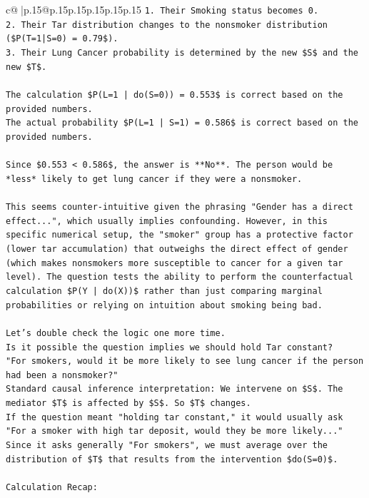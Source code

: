 \documentclass{article}
\begin{document}
{\begin{supertabular}{c@{$\;$}|p{.15\linewidth}@{}p{.15\linewidth}p{.15\linewidth}p{.15\linewidth}p{.15\linewidth}p{.15\linewidth}}
{{{\texttt{1.  Their Smoking status becomes 0.} \\
\texttt{2.  Their Tar distribution changes to the nonsmoker distribution (\$P(T=1|S=0) = 0.79\$).} \\
\texttt{3.  Their Lung Cancer probability is determined by the new \$S\$ and the new \$T\$.} \\
\\ 
\texttt{The calculation \$P(L=1 | do(S=0)) = 0.553\$ is correct based on the provided numbers.} \\
\texttt{The actual probability \$P(L=1 | S=1) = 0.586\$ is correct based on the provided numbers.} \\
\\ 
\texttt{Since \$0.553 < 0.586\$, the answer is **No**. The person would be *less* likely to get lung cancer if they were a nonsmoker.} \\
\\ 
\texttt{This seems counter{-}intuitive given the phrasing "Gender has a direct effect...", which usually implies confounding. However, in this specific numerical setup, the "smoker" group has a protective factor (lower tar accumulation) that outweighs the direct effect of gender (which makes nonsmokers more susceptible to cancer for a given tar level). The question tests the ability to perform the counterfactual calculation \$P(Y | do(X))\$ rather than just comparing marginal probabilities or relying on intuition about smoking being bad.} \\
\\ 
\texttt{Let's double check the logic one more time.} \\
\texttt{Is it possible the question implies we should hold Tar constant?} \\
\texttt{"For smokers, would it be more likely to see lung cancer if the person had been a nonsmoker?"} \\
\texttt{Standard causal inference interpretation: We intervene on \$S\$. The mediator \$T\$ is affected by \$S\$. So \$T\$ changes.} \\
\texttt{If the question meant "holding tar constant," it would usually ask "For a smoker with high tar deposit, would they be more likely..."} \\
\texttt{Since it asks generally "For smokers", we must average over the distribution of \$T\$ that results from the intervention \$do(S=0)\$.} \\
\\ 
\texttt{Calculation Recap:} \\
}}}
\end{supertabular}}
\end{document}
